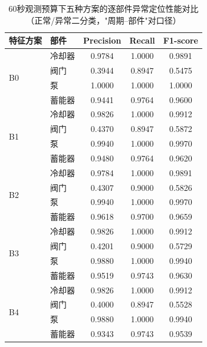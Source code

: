 \documentclass[12pt, a4paper]{ctexart}
\begin{document}
\begin{table}[H]
  \centering
  \caption{60秒观测预算下五种方案的逐部件异常定位性能对比（正常/异常二分类，"周期--部件"对口径）}
  \label{tab:part_prf}
  \small
  \setlength{\tabcolsep}{6pt}
  \begin{tabular}{llccc}
    \toprule
    特征方案 & 部件 & Precision & Recall & F1-score \\
    \midrule
    \multirow{4}{*}{B0} & 冷却器 & 0.9784 & 1.0000 & 0.9891 \\
                        & 阀门   & 0.3944 & 0.8947 & 0.5475 \\
                        & 泵     & 1.0000 & 1.0000 & 1.0000 \\
                        & 蓄能器 & 0.9441 & 0.9764 & 0.9600 \\
    \midrule
    \multirow{4}{*}{B1} & 冷却器 & 0.9826 & 1.0000 & 0.9912 \\
                        & 阀门   & 0.4370 & 0.8947 & 0.5872 \\
                        & 泵     & 0.9940 & 1.0000 & 0.9970 \\
                        & 蓄能器 & 0.9480 & 0.9764 & 0.9620 \\
    \midrule
    \multirow{4}{*}{B2} & 冷却器 & 0.9784 & 1.0000 & 0.9891 \\
                        & 阀门   & 0.4307 & 0.9000 & 0.5826 \\
                        & 泵     & 0.9940 & 1.0000 & 0.9970 \\
                        & 蓄能器 & 0.9618 & 0.9700 & 0.9659 \\
    \midrule
    \multirow{4}{*}{B3} & 冷却器 & 0.9826 & 1.0000 & 0.9912 \\
                        & 阀门   & 0.4201 & 0.9000 & 0.5729 \\
                        & 泵     & 0.9880 & 1.0000 & 0.9940 \\
                        & 蓄能器 & 0.9519 & 0.9743 & 0.9630 \\
    \midrule
    \multirow{4}{*}{B4} & 冷却器 & 0.9826 & 1.0000 & 0.9912 \\
                        & 阀门   & 0.4000 & 0.8947 & 0.5528 \\
                        & 泵     & 0.9880 & 1.0000 & 0.9940 \\
                        & 蓄能器 & 0.9343 & 0.9743 & 0.9539 \\
    \bottomrule
  \end{tabular}
\end{table}
\end{document}
